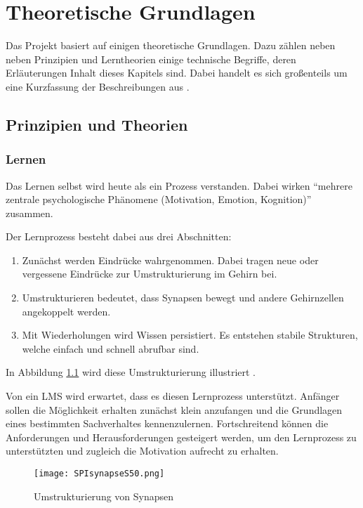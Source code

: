 \chapter{Theoretische Grundlagen}\label{ref:basics}
Das Projekt basiert auf einigen theoretische Grundlagen. Dazu zählen
neben neben Prinzipien und Lerntheorien einige technische Begriffe, deren
Erläuterungen Inhalt dieses Kapitels sind. Dabei handelt es sich großenteils um
eine Kurzfassung der Beschreibungen aus \cite{gruben:2012}.

\section{Prinzipien und Theorien}
\subsection{Lernen}
Das Lernen selbst wird heute als ein Prozess verstanden. Dabei wirken "`mehrere
zentrale psychologische Phänomene (Motivation, Emotion,
Kognition)"'\cite{niegemann:2004} zusammen.

Der Lernprozess besteht dabei aus drei Abschnitten:
\begin{enumerate}
  \item Zunächst werden Eindrücke wahrgenommen. Dabei tragen neue oder
  vergessene Eindrücke zur Umstrukturierung im Gehirn bei.
  \item Umstrukturieren bedeutet, dass Synapsen bewegt und andere Gehirnzellen
  angekoppelt werden.
  \item Mit Wiederholungen wird Wissen persistiert. Es entstehen stabile
  Strukturen, welche einfach und schnell abrufbar sind.
\end{enumerate}
In Abbildung \ref{pic:structSyn} wird diese Umstrukturierung illustriert
\cite{spitzer:2012}.

Von ein LMS wird erwartet, dass es diesen Lernprozess unterstützt. Anfänger
sollen die Möglichkeit erhalten zunächst klein anzufangen und die Grundlagen
eines bestimmten Sachverhaltes kennenzulernen. Fortschreitend können die
Anforderungen und Herausforderungen gesteigert werden, um den Lernprozess zu
unterstützten und zugleich die Motivation aufrecht zu erhalten.

\begin{figure}[H]
\centering
\texttt{[image: SPIsynapseS50.png]}
\caption{Umstrukturierung von Synapsen \footnotemark}\label{pic:structSyn}
\end{figure}

